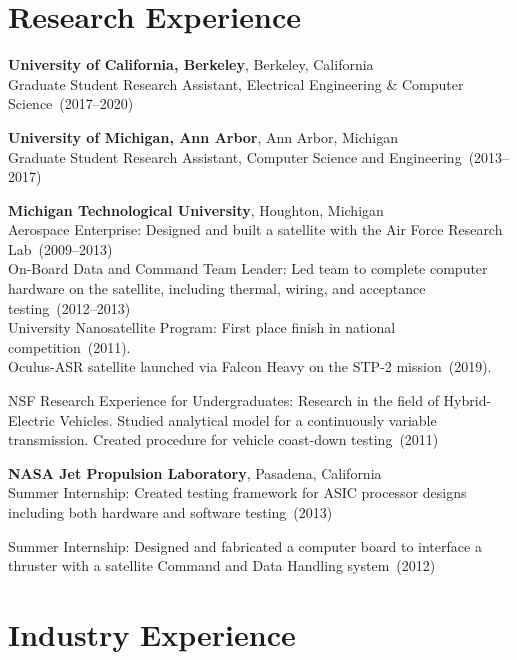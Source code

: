 \documentclass{article}
\begin{document}
\section*{Research Experience}
\vspace{-6pt}

{\bf University of California, Berkeley}, Berkeley, California \\
Graduate Student Research Assistant, Electrical Engineering \& Computer Science~(2017--2020)

{\bf University of Michigan, Ann Arbor}, Ann Arbor, Michigan \\
Graduate Student Research Assistant, Computer Science and Engineering~(2013--2017)

{\bf Michigan Technological University}, Houghton, Michigan \\
Aerospace Enterprise: Designed and built a satellite with the Air Force Research Lab~(2009--2013) \\
On-Board Data and Command Team Leader: Led team to complete computer hardware
on the satellite, including thermal, wiring, and acceptance testing~(2012--2013) \\
University Nanosatellite Program: First place finish in national competition~(2011). \\
Oculus-ASR satellite launched via Falcon Heavy on the STP-2 mission~(2019).

NSF Research Experience for Undergraduates: Research in the field of
Hybrid-Electric Vehicles. Studied analytical model for a continuously variable
transmission. Created procedure for vehicle coast-down testing~(2011)


{\bf NASA Jet Propulsion Laboratory}, Pasadena, California \\
Summer Internship: Created testing framework for ASIC processor designs
including both hardware and software testing~(2013)

Summer Internship: Designed and fabricated a computer board to interface a
thruster with a satellite Command and Data Handling system~(2012)



\section*{Industry Experience}
\vspace{-6pt}
\end{document}
